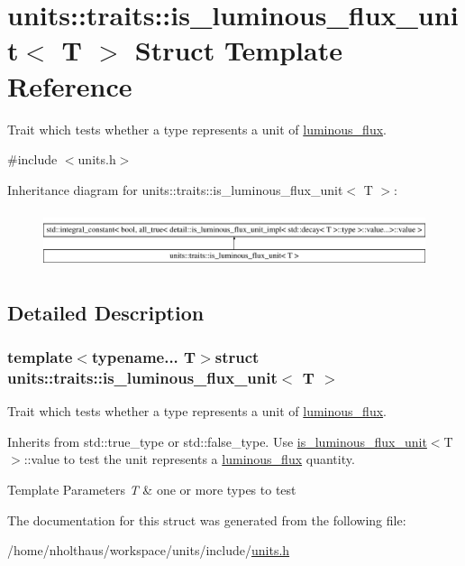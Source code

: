 \hypertarget{structunits_1_1traits_1_1is__luminous__flux__unit}{}\section{units\+:\+:traits\+:\+:is\+\_\+luminous\+\_\+flux\+\_\+unit$<$ T $>$ Struct Template Reference}
\label{structunits_1_1traits_1_1is__luminous__flux__unit}


Trait which tests whether a type represents a unit of \hyperlink{namespaceunits_1_1luminous__flux}{luminous\+\_\+flux}.  




{\ttfamily \#include $<$units.\+h$>$}

Inheritance diagram for units\+:\+:traits\+:\+:is\+\_\+luminous\+\_\+flux\+\_\+unit$<$ T $>$\+:\begin{figure}[H]
\begin{center}
\leavevmode
\includegraphics[height=1.676647cm]{structunits_1_1traits_1_1is__luminous__flux__unit}
\end{center}
\end{figure}


\subsection{Detailed Description}
\subsubsection*{template$<$typename... T$>$struct units\+::traits\+::is\+\_\+luminous\+\_\+flux\+\_\+unit$<$ T $>$}

Trait which tests whether a type represents a unit of \hyperlink{namespaceunits_1_1luminous__flux}{luminous\+\_\+flux}. 

Inherits from {\ttfamily std\+::true\+\_\+type} or {\ttfamily std\+::false\+\_\+type}. Use {\ttfamily \hyperlink{structunits_1_1traits_1_1is__luminous__flux__unit}{is\+\_\+luminous\+\_\+flux\+\_\+unit}$<$T$>$\+::value} to test the unit represents a \hyperlink{namespaceunits_1_1luminous__flux}{luminous\+\_\+flux} quantity. 
\begin{DoxyTemplParams}{Template Parameters}
{\em T} & one or more types to test \\
\hline
\end{DoxyTemplParams}


The documentation for this struct was generated from the following file\+:\begin{DoxyCompactItemize}
\item 
/home/nholthaus/workspace/units/include/\hyperlink{units_8h}{units.\+h}\end{DoxyCompactItemize}
